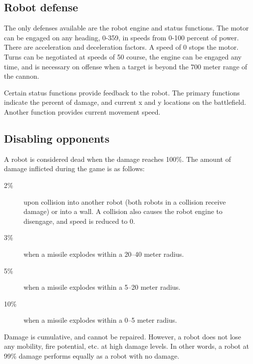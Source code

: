 \documentclass{article}
\begin{document}
\subsection{Robot defense }

        The only defenses available are the robot engine and status
        functions.  The motor can be engaged on any heading, 0-359, in
        speeds from 0-100 percent of power.  There are acceleration and
        deceleration factors.  A speed of 0 stops the motor.  Turns can
        be negotiated at speeds of 50%
        course, the engine can be engaged any time, and is necessary
        on offense when a target is beyond the 700 meter range of the
        cannon.

        Certain status functions provide feedback to the robot. The
        primary functions indicate the percent of damage, and current x
        and y locations on the battlefield.  Another function provides
        current movement speed.


\subsection{Disabling opponents}

        A robot is considered dead when the damage reaches 100\%.  The
        amount of damage inflicted during the game is as follows:

\begin{description}
\item[2\%] upon collision into another robot (both robots in a    
                     collision receive damage) or into a wall.  A
                     collision also causes the robot engine to disengage,
                     and speed is reduced to 0.

\item[3\%] when a missile explodes within a 20--40 meter radius.

\item[5\%] when a missile explodes within a 5--20 meter radius.

\item[10\%] when a missile explodes within a 0--5 meter radius.
\end{description}

        Damage is cumulative, and cannot be repaired.  However, a robot
        does not lose any mobility, fire potential, etc. at high damage
        levels.  In other words, a robot at 99\% damage performs equally
        as a robot with no damage.
\end{document}
